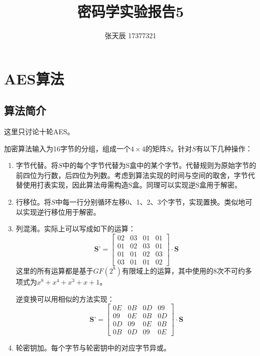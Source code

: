 \documentclass[11pt]{ctexart}
\title{密码学实验报告5}
\author{张天辰 17377321}
\begin{document}
\maketitle{}



\section{AES算法}
\subsection{算法简介}
这里只讨论十轮AES。

加密算法输入为16字节的分组，组成一个$4 \times 4$的矩阵\textbf{$S$}。针对\textbf{$S$}有以下几种操作：

\begin{enumerate}[1]
    \item 字节代替。将\textbf{$S$}中的每个字节代替为S盒中的某个字节。代替规则为原始字节的前四位为行数，后四位为列数。考虑到算法实现的时间与空间的取舍，字节代替使用打表实现，因此算法毋需构造S盒。同理可以实现逆S盒用于解密。
    \item 行移位。将\textbf{$S$}中每一行分别循环左移0、1、2、3个字节，实现置换。类似地可以实现逆行移位用于解密。
    \item 列混淆。实际上可以写成如下的运算：
        \begin{equation}
            \textbf{S'} = {
            \begin{bmatrix}
                02 & 03 & 01 & 01 \\
                01 & 02 & 03 & 01 \\
                01 & 01 & 02 & 03 \\
                03 & 01 & 01 & 02
            \end{bmatrix}
            }\cdot \textbf{S}
        \end{equation}
        这里的所有运算都是基于$GF(2^8)$有限域上的运算，其中使用的8次不可约多项式为$x^8 + x^4 + x^3 + x + 1$。

        逆变换可以用相似的方法实现：
        \begin{equation}
            \textbf{S'} = {
            \begin{bmatrix}
                0E & 0B & 0D & 09 \\
                09 & 0E & 0B & 0D \\
                0D & 09 & 0E & 0B \\
                0B & 0D & 09 & 0E
            \end{bmatrix}
            }\cdot \textbf{S}
        \end{equation}
    \item 轮密钥加。每个字节与轮密钥中的对应字节异或。
    \end{enumerate}
\end{document}
